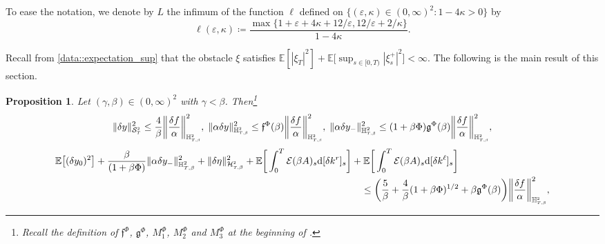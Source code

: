 \documentclass[10pt]{article} %
\newtheorem{proposition}[theorem]{Proposition}
\newcommand\cE{\mathcal E}
\newcommand\cH{\mathcal H}
\newcommand\cS{\mathcal S}
\newcommand{\smalltext}[1]{\text{\fontsize{4}{4}\selectfont$#1$}}
\newcommand\ff{\mathfrak f}
\newcommand\fg{\mathfrak g}
\def \E{\mathbb{E}}
\def \H{\mathbb{H}}
\newcommand{\1}{\mathbf{1}}
\def\d{\mathrm{d}}
\begin{document}
To ease the notation, we denote by $L$ the infimum of the function $\ell$ defined on $\{(\varepsilon,\kappa) \in (0,\infty)^2 : 1-4\kappa > 0\}$ by
\begin{equation*}
	\ell(\varepsilon,\kappa) \coloneqq \frac{\max\{1 + \varepsilon+4\kappa + 12/\varepsilon,12/\varepsilon + 2/\kappa\}}{1-4\kappa}.
\end{equation*}

Recall from \ref{data::expectation_sup} that the obstacle $\xi$ satisfies $\E[|\xi_T|^2] + \E\big[ \sup_{s \in [0,T)} |\xi^+_s|^2  \big] < \infty.$ The following is the main result of this section.
\begin{proposition}\label{prop::apriori}
	Let $(\gamma,\beta) \in (0,\infty)^2$ with $\gamma < \beta$. Then\footnote{Recall the definition of $\ff^\Phi$, $\fg^\Phi$, $M^\Phi_1$, $M^\Phi_2$ and $M^\Phi_3$ at the beginning of .}
	\begin{equation*}
			\|\delta y\|^2_{\cS^\smalltext{2}_\smalltext{T}} \leq \frac{4}{\beta} \bigg\| \frac{\delta f}{\alpha} \bigg\|^2_{\H^{\smalltext{2}}_{\smalltext{T}\smalltext{,}\smalltext{\beta}}},
			\;
			\|\alpha \delta y\|^2_{\H^{\smalltext{2}}_{\smalltext{T}\smalltext{,}\smalltext{\beta}}} 
			\leq \ff^\Phi(\beta) \bigg\| \frac{\delta f}{\alpha} \bigg\|^2_{\H^{\smalltext{2}}_{\smalltext{T}\smalltext{,}\smalltext{\beta}}},
			\;
			\|\alpha \delta y_-\|^2_{\H^2_{\smalltext{T}\smalltext{,}\smalltext{\beta}}} 
			\leq (1+\beta\Phi) \fg^\Phi(\beta)\bigg\|\frac{\delta f}{\alpha}\bigg\|^2_{\mathbb{H}^\smalltext{2}_{\smalltext{T}\smalltext{,}\smalltext{\beta}}},
	\end{equation*}
	\begin{align*}
		\E\big[(\delta y_0)^2\big] + \frac{\beta}{(1+\beta\Phi)}\|\alpha\delta y_{-}\|^2_{\H^2_{T,\beta}} + \|\delta\eta\|^2_{\cH^\smalltext{2}_{\smalltext{T}\smalltext{,}\beta}} + \E\bigg[\int_0^T \cE(\beta A)_s \d[\delta k^r]_s\bigg] &+ \E\bigg[\int_0^T \cE(\beta A)_s \d[\delta k^\ell]_s\bigg]  \\
		&\quad \leq \bigg( \frac{5}{\beta} + \frac{4}{\beta}(1+\beta\Phi)^{1/2} + \beta \fg^\Phi(\beta) \bigg)\bigg\|\frac{\delta f}{\alpha}\bigg\|^2_{\H^\smalltext{2}_{\smalltext{T}\smalltext{,}\smalltext{\beta}}},
	\end{align*}


\end{proposition}
\end{document}
